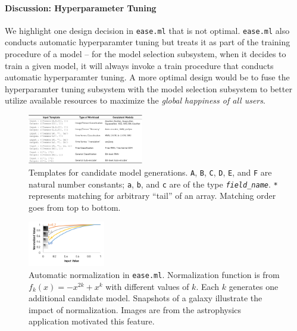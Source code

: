 \documentclass[letterpaper]{vldb}
\newcommand{\eml}{\texttt{ease.ml}\xspace}
\begin{document}
\paragraph*{Discussion: Hyperparameter Tuning}
We highlight one design decision in \eml
that is not optimal. \eml also conducts automatic
hyperparamter tuning but treats it as part of the
training procedure of a model -- for the model selection
subsystem, when it decides to train a given model,
it will always invoke a train procedure that conducts
automatic hyperparamter tuning. A more optimal design 
would be to fuse the hyperparamter tuning subsystem
with the model selection subsystem to better
utilize available resources to maximize the
{\em global happiness of all users}.






\begin{figure}[t]
\centering
\includegraphics[width=0.45\textwidth]{figures/models}
\vspace{-1em}
\caption{Templates for candidate model generations. \texttt{A},
\texttt{B}, \texttt{C}, \texttt{D}, \texttt{E}, and \texttt{F}
are natural number constants; \texttt{a}, \texttt{b}, and \texttt{c} are of the type \texttt{\em field\_name}. \texttt{*} represents
matching for arbitrary ``tail'' of an array. Matching order
goes from top to bottom.}
\label{fig:templates}
\vspace{-1em}
\end{figure}

\begin{figure}[t]
\centering
\includegraphics[width=0.3\textwidth]{figures/normalize}
\vspace{-2em}
\caption{Automatic normalization in \eml. Normalization function
is from $f_k(x) = -x^{2k} + x^{k}$ with different 
values of $k$. Each $k$ generates one additional candidate
model. Snapshots of a galaxy illustrate the impact of
normalization. Images are from the astrophysics 
application motivated this feature.}
 \label{fig:normalization}
\end{figure}
\end{document}
